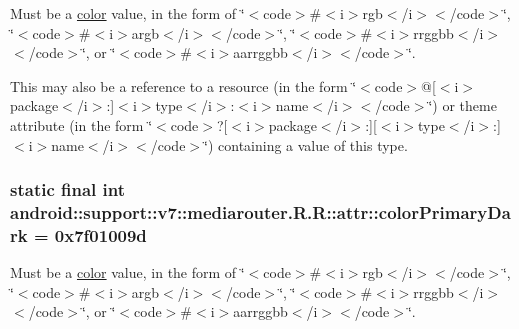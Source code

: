 Must be a \hyperlink{classandroid_1_1support_1_1v7_1_1mediarouter_1_1_r_1_1color}{color} value, in the form of \char`\"{}$<$code$>$\#$<$i$>$rgb$<$/i$>$$<$/code$>$\char`\"{}, \char`\"{}$<$code$>$\#$<$i$>$argb$<$/i$>$$<$/code$>$\char`\"{}, \char`\"{}$<$code$>$\#$<$i$>$rrggbb$<$/i$>$$<$/code$>$\char`\"{}, or \char`\"{}$<$code$>$\#$<$i$>$aarrggbb$<$/i$>$$<$/code$>$\char`\"{}. 

This may also be a reference to a resource (in the form \char`\"{}$<$code$>$@\mbox{[}$<$i$>$package$<$/i$>$:\mbox{]}$<$i$>$type$<$/i$>$:$<$i$>$name$<$/i$>$$<$/code$>$\char`\"{}) or theme attribute (in the form \char`\"{}$<$code$>$?\mbox{[}$<$i$>$package$<$/i$>$:\mbox{]}\mbox{[}$<$i$>$type$<$/i$>$:\mbox{]}$<$i$>$name$<$/i$>$$<$/code$>$\char`\"{}) containing a value of this type. \hypertarget{classandroid_1_1support_1_1v7_1_1mediarouter_1_1_r_1_1attr_787d2ecf0db0ca232fd75aab3d655ea0}{
\subsubsection[{colorPrimaryDark}]{\setlength{\rightskip}{0pt plus 5cm}static final int android::support::v7::mediarouter.R.R::attr::colorPrimaryDark = 0x7f01009d}}
\label{classandroid_1_1support_1_1v7_1_1mediarouter_1_1_r_1_1attr_787d2ecf0db0ca232fd75aab3d655ea0}


Must be a \hyperlink{classandroid_1_1support_1_1v7_1_1mediarouter_1_1_r_1_1color}{color} value, in the form of \char`\"{}$<$code$>$\#$<$i$>$rgb$<$/i$>$$<$/code$>$\char`\"{}, \char`\"{}$<$code$>$\#$<$i$>$argb$<$/i$>$$<$/code$>$\char`\"{}, \char`\"{}$<$code$>$\#$<$i$>$rrggbb$<$/i$>$$<$/code$>$\char`\"{}, or \char`\"{}$<$code$>$\#$<$i$>$aarrggbb$<$/i$>$$<$/code$>$\char`\"{}. 


